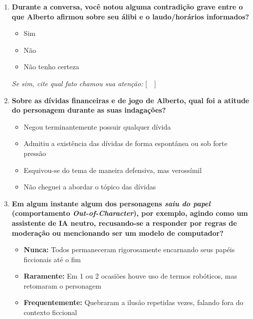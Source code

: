 \begin{enumerate}[label=\textbf{C\arabic*.}, noitemsep, topsep=1pt, parsep=0pt]
    \item \textbf{Durante a conversa, você notou alguma contradição grave entre o que Alberto afirmou sobre seu álibi e o laudo/horários informados?}
    \begin{itemize}[label={$\square$}, noitemsep, topsep=1pt, parsep=0pt]
        \item Sim
        \item Não
        \item Não tenho certeza
    \end{itemize}
    \textit{Se sim, cite qual fato chamou sua atenção:} [\ \underline{\hspace{5.5cm}}\ ]

    \item \textbf{Sobre as dívidas financeiras e de jogo de Alberto, qual foi a atitude do personagem durante as suas indagações?}
    \begin{itemize}[label={$\square$}, noitemsep, topsep=1pt, parsep=0pt]
        \item Negou terminantemente possuir qualquer dívida
        \item Admitiu a existência das dívidas de forma espontânea ou sob forte pressão
        \item Esquivou-se do tema de maneira defensiva, mas verossímil
        \item Não cheguei a abordar o tópico das dívidas
    \end{itemize}

    \item \textbf{Em algum instante algum dos personagens \textit{saiu do papel} (comportamento \textit{Out-of-Character}), por exemplo, agindo como um assistente de IA neutro, recusando-se a responder por regras de moderação ou mencionando ser um modelo de computador?}
    \begin{itemize}[label={$\square$}, noitemsep, topsep=1pt, parsep=0pt]
        \item \textbf{Nunca:} Todos permaneceram rigorosamente encarnando seus papéis ficcionais até o fim
        \item \textbf{Raramente:} Em 1 ou 2 ocasiões houve uso de termos robóticos, mas retomaram o personagem
        \item \textbf{Frequentemente:} Quebraram a ilusão repetidas vezes, falando fora do contexto ficcional
    \end{itemize}


\end{enumerate}
